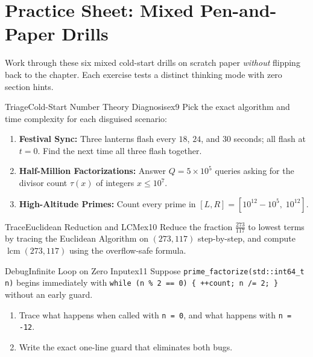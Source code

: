 \documentclass[11pt,a4paper]{article}
\theoremstyle{definition}
\newcounter{exercise}
\begin{document}
\section*{Practice Sheet: Mixed Pen-and-Paper Drills}

\noindent
Work through these six mixed cold-start drills on scratch paper \emph{without} flipping back to the chapter. Each exercise tests a distinct thinking mode with zero section hints.

\begin{tryitbox}{Triage}{Cold-Start Number Theory Diagnosis}{ex9}
Pick the exact algorithm and time complexity for each disguised scenario:
\begin{enumerate}
    \item \textbf{Festival Sync:} Three lanterns flash every $18$, $24$, and $30$ seconds; all flash at $t = 0$. Find the next time all three flash together.
    \item \textbf{Half-Million Factorizations:} Answer $Q = 5 \times 10^5$ queries asking for the divisor count $\tau(x)$ of integers $x \le 10^7$.
    \item \textbf{High-Altitude Primes:} Count every prime in $[L, R] = [10^{12} - 10^5,\; 10^{12}]$.
\end{enumerate}
\end{tryitbox}

\begin{tryitbox}{Trace}{Euclidean Reduction and LCM}{ex10}
Reduce the fraction $\frac{273}{117}$ to lowest terms by tracing the Euclidean Algorithm on $(273, 117)$ step-by-step, and compute $\operatorname{lcm}(273, 117)$ using the overflow-safe formula.
\end{tryitbox}

\begin{tryitbox}{Debug}{Infinite Loop on Zero Input}{ex11}
Suppose \texttt{prime\_factorize(std::int64\_t n)} begins immediately with \texttt{while (n \% 2 == 0) \{ ++count; n /= 2; \}} without an early guard.
\begin{enumerate}
    \item Trace what happens when called with \texttt{n = 0}, and what happens with \texttt{n = -12}.
    \item Write the exact one-line guard that eliminates both bugs.
\end{enumerate}
\end{tryitbox}
\end{document}
